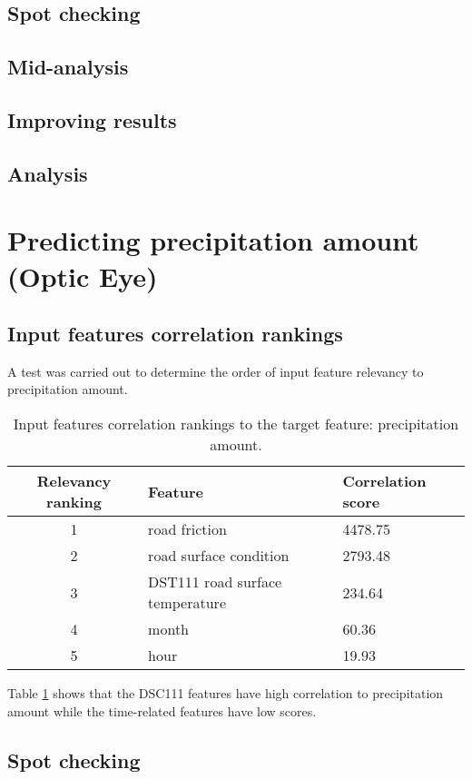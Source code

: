 	\subsection{Spot checking}
	\subsection{Mid-analysis}
	\subsection{Improving results}
		
	\subsection{Analysis}

\section{Predicting precipitation amount (Optic Eye)}
	\subsection{Input features correlation rankings}
		A test was carried out to determine the order of input feature relevancy to precipitation amount.

	\begin{table}[H]
		\centering
		\caption{Input features correlation rankings to the target feature: precipitation amount. }
		\begin{tabular}[3]{c | l | l }
    			Relevancy ranking & Feature & Correlation score  \\
			 \hline
			1 & road friction & 4478.75 \\
			2 & road surface condition & 2793.48 \\
			3 & DST111 road surface temperature & 234.64 \\
			4 & month & 60.36 \\
			5 & hour & 19.93 
			\label{table:feature_comparison_precamount}
		\end{tabular}
	\end{table}

		Table \ref{table:feature_comparison_precamount} shows that the DSC111 features have high correlation to precipitation amount while the time-related features have low scores. 

	\subsection{Spot checking}


